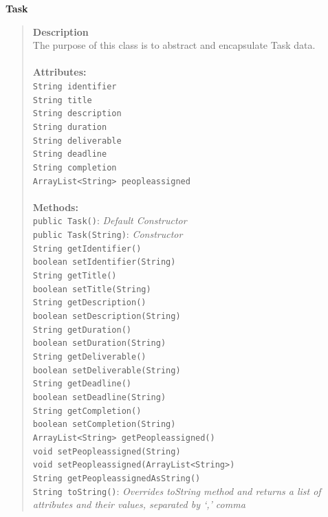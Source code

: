 \documentclass[12pt]{article}
\begin{document}
{\bf Task}
\begin{quote}
{\bf Description}\\
The purpose of this class is to abstract and encapsulate Task data.\\\\
{\bf Attributes:}\\
\texttt{String identifier}\\
\texttt{String title}\\
\texttt{String description}\\
\texttt{String duration}\\
\texttt{String deliverable}\\
\texttt{String deadline}\\
\texttt{String completion}\\
\texttt{ArrayList<String> peopleassigned }\\\\
{\bf Methods:}\\
\texttt{public Task()}:   \emph{Default Constructor}\\
\texttt{public Task(String)}:   \emph{Constructor}\\
\texttt{String getIdentifier()  }\\
\texttt{boolean setIdentifier(String)  }\\
\texttt{String getTitle()  }\\
\texttt{boolean setTitle(String)  }\\
\texttt{String getDescription()  }\\
\texttt{boolean setDescription(String)  }\\
\texttt{String getDuration() }\\
\texttt{boolean setDuration(String)  }\\
\texttt{String getDeliverable() }\\
\texttt{boolean setDeliverable(String) }\\
\texttt{String getDeadline()  }\\
\texttt{boolean setDeadline(String) }\\
\texttt{String getCompletion() }\\
\texttt{boolean setCompletion(String) }\\
\texttt{ArrayList<String> getPeopleassigned() }\\
\texttt{void setPeopleassigned(String)  }\\
\texttt{void setPeopleassigned(ArrayList<String>) }\\
\texttt{String getPeopleassignedAsString()  }\\
\texttt{String toString()}: \emph{Overrides toString method and returns a list of attributes and their values, separated by `,' comma}
\end{quote}
\end{document}
